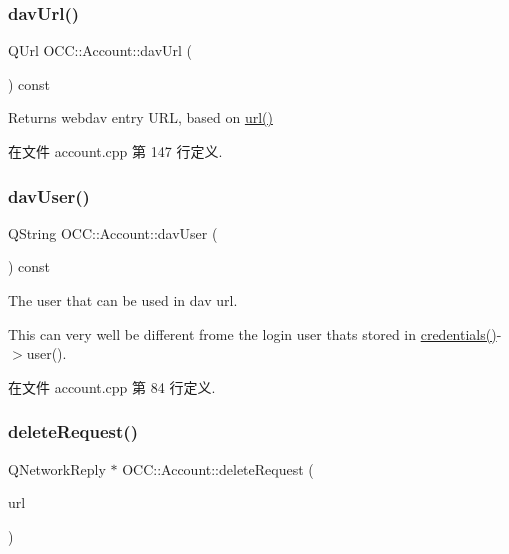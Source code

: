 \subsubsection{\texorpdfstring{dav\+Url()}{davUrl()}}
{\footnotesize\ttfamily Q\+Url O\+C\+C\+::\+Account\+::dav\+Url (\begin{DoxyParamCaption}{ }\end{DoxyParamCaption}) const}

Returns webdav entry U\+RL, based on \hyperlink{class_o_c_c_1_1_account_a8aa1b92581de450a356a51ad8760d1f1}{url()} 

在文件 account.\+cpp 第 147 行定义.

\mbox{\label{class_o_c_c_1_1_account_ad2b36362bb8cb4c202b5cb13714fc123}} 
\subsubsection{\texorpdfstring{dav\+User()}{davUser()}}
{\footnotesize\ttfamily Q\+String O\+C\+C\+::\+Account\+::dav\+User (\begin{DoxyParamCaption}{ }\end{DoxyParamCaption}) const}

The user that can be used in dav url.

This can very well be different frome the login user that\textquotesingle{}s stored in \hyperlink{class_o_c_c_1_1_account_aead250da94c2a743e702268f60a6e781}{credentials()}-\/$>$user(). 

在文件 account.\+cpp 第 84 行定义.

\mbox{\label{class_o_c_c_1_1_account_a781f430797c6f2236c787cf3e3a6baa2}} 
\subsubsection{\texorpdfstring{delete\+Request()}{deleteRequest()}}
{\footnotesize\ttfamily Q\+Network\+Reply $\ast$ O\+C\+C\+::\+Account\+::delete\+Request (\begin{DoxyParamCaption}\item[{const Q\+Url \&}]{url }\end{DoxyParamCaption})}



